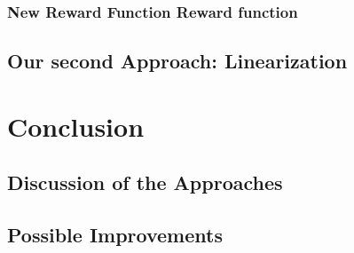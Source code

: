 \subsection{New Reward Function Reward function}
\section{Our second Approach: Linearization}

\chapter{Conclusion}
\section{Discussion of the Approaches}
\section{Possible Improvements}

\appendix

\nocite{*}
\printbibliography
\listoffigures
\listoftables
\listoflistings


